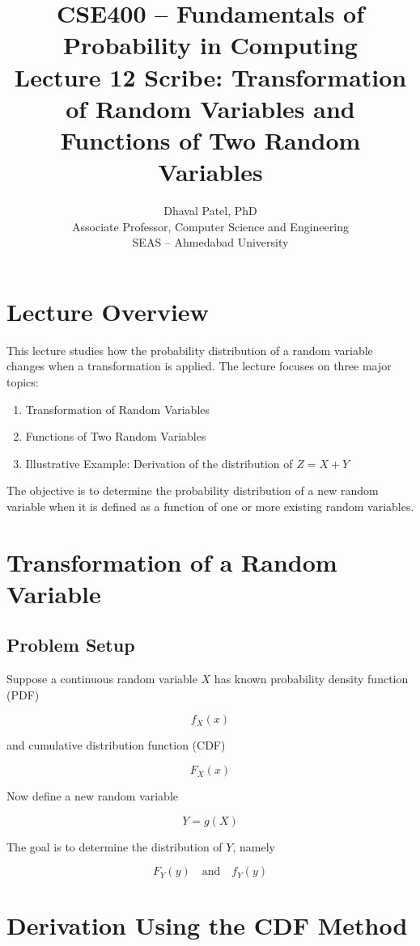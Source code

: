 \documentclass[11pt]{article}
\title{
CSE400 -- Fundamentals of Probability in Computing\\
\large Lecture 12 Scribe: Transformation of Random Variables and Functions of Two Random Variables
}
\author{
Dhaval Patel, PhD\\
Associate Professor, Computer Science and Engineering\\
SEAS -- Ahmedabad University
}
\date{}
\begin{document}
\maketitle

\onehalfspacing

\section{Lecture Overview}

This lecture studies how the probability distribution of a random variable changes when a transformation is applied. The lecture focuses on three major topics:

\begin{enumerate}
    \item Transformation of Random Variables
    \item Functions of Two Random Variables
    \item Illustrative Example: Derivation of the distribution of $Z = X + Y$
\end{enumerate}

The objective is to determine the probability distribution of a new random variable when it is defined as a function of one or more existing random variables.

\section{Transformation of a Random Variable}

\subsection{Problem Setup}

Suppose a continuous random variable $X$ has known probability density function (PDF)

\[
f_X(x)
\]

and cumulative distribution function (CDF)

\[
F_X(x)
\]

Now define a new random variable

\[
Y = g(X)
\]

The goal is to determine the distribution of $Y$, namely

\[
F_Y(y) \quad \text{and} \quad f_Y(y)
\]

\section{Derivation Using the CDF Method}
\end{document}
